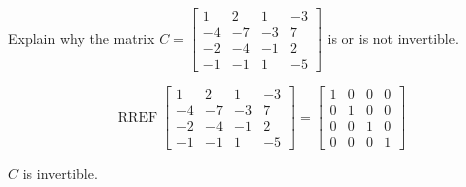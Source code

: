 
\begin{exerciseStatement}


Explain why the matrix \(C= \left[\begin{array}{cccc}
1 & 2 & 1 & -3 \\
-4 & -7 & -3 & 7 \\
-2 & -4 & -1 & 2 \\
-1 & -1 & 1 & -5
\end{array}\right] \) is or is not invertible.


\end{exerciseStatement}
    
\begin{exerciseAnswer} 


\[\operatorname{RREF} \left[\begin{array}{cccc}
1 & 2 & 1 & -3 \\
-4 & -7 & -3 & 7 \\
-2 & -4 & -1 & 2 \\
-1 & -1 & 1 & -5
\end{array}\right] = \left[\begin{array}{cccc}
1 & 0 & 0 & 0 \\
0 & 1 & 0 & 0 \\
0 & 0 & 1 & 0 \\
0 & 0 & 0 & 1
\end{array}\right] \]

\(C\) is invertible.
\end{exerciseAnswer}
    
